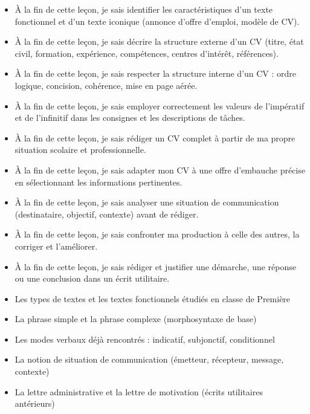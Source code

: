 \documentclass[11pt]{article}
\begin{document}
\begin{objectifs}
\begin{itemize}
\item À la fin de cette leçon, je sais identifier les caractéristiques d'un texte fonctionnel et d'un texte iconique (annonce d'offre d'emploi, modèle de CV).
\item À la fin de cette leçon, je sais décrire la structure externe d'un CV (titre, état civil, formation, expérience, compétences, centres d'intérêt, références).
\item À la fin de cette leçon, je sais respecter la structure interne d'un CV : ordre logique, concision, cohérence, mise en page aérée.
\item À la fin de cette leçon, je sais employer correctement les valeurs de l'impératif et de l'infinitif dans les consignes et les descriptions de tâches.
\item À la fin de cette leçon, je sais rédiger un CV complet à partir de ma propre situation scolaire et professionnelle.
\item À la fin de cette leçon, je sais adapter mon CV à une offre d'embauche précise en sélectionnant les informations pertinentes.
\item À la fin de cette leçon, je sais analyser une situation de communication (destinataire, objectif, contexte) avant de rédiger.
\item À la fin de cette leçon, je sais confronter ma production à celle des autres, la corriger et l'améliorer.
\item À la fin de cette leçon, je sais rédiger et justifier une démarche, une réponse ou une conclusion dans un écrit utilitaire.
\end{itemize}
\end{objectifs}

\begin{prerequis}
\begin{itemize}
\item Les types de textes et les textes fonctionnels étudiés en classe de Première
\item La phrase simple et la phrase complexe (morphosyntaxe de base)
\item Les modes verbaux déjà rencontrés : indicatif, subjonctif, conditionnel
\item La notion de situation de communication (émetteur, récepteur, message, contexte)
\item La lettre administrative et la lettre de motivation (écrits utilitaires antérieurs)
\end{itemize}
\end{prerequis}
\end{document}
